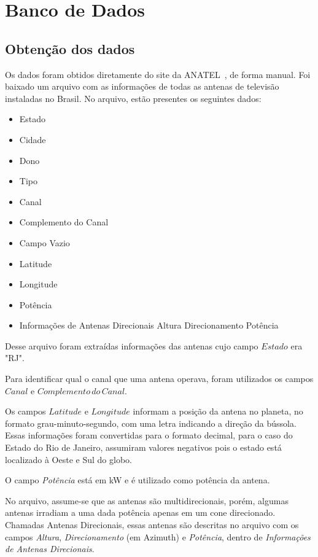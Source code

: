 \section{Banco de Dados}

\subsection{Obtenção dos dados}

Os dados foram obtidos diretamente do site da ANATEL~\cite{channelstable}, de forma manual. Foi baixado um arquivo com as informações de todas as antenas de televisão instaladas no Brasil. No arquivo, estão presentes os seguintes dados:

\begin{itemize}
\item Estado
\item Cidade
\item Dono
\item Tipo
\item Canal
\item Complemento do Canal 
\item Campo Vazio
\item Latitude 
\item Longitude 
\item Potência
\item Informações de Antenas Direcionais
	\subitem Altura
	\subitem Direcionamento
	\subitem Potência
\end{itemize}

Desse arquivo foram extraídas informações das antenas cujo campo $Estado$ era "RJ".

Para identificar qual o canal que uma antena operava, foram utilizados os campos $Canal$ e $Complemento\, do\, Canal$.

Os campos $Latitude$ e $Longitude$ informam a posição da antena no planeta, no formato grau-minuto-segundo, com uma letra indicando a direção da bússola. Essas informações foram convertidas para o formato decimal, para o caso do Estado do Rio de Janeiro, assumiram valores negativos pois o estado está localizado à Oeste e Sul do globo.

O campo \textit{Potência} está em kW e é utilizado como potência da antena.

No arquivo, assume-se que as antenas são multidirecionais, porém, algumas antenas irradiam a uma dada potência apenas em um cone direcionado. Chamadas Antenas Direcionais, essas antenas são descritas no arquivo com os campos \textit{Altura}, \textit{Direcionamento} (em Azimuth) e \textit{Potência}, dentro de \textit{Informações de Antenas Direcionais}.

